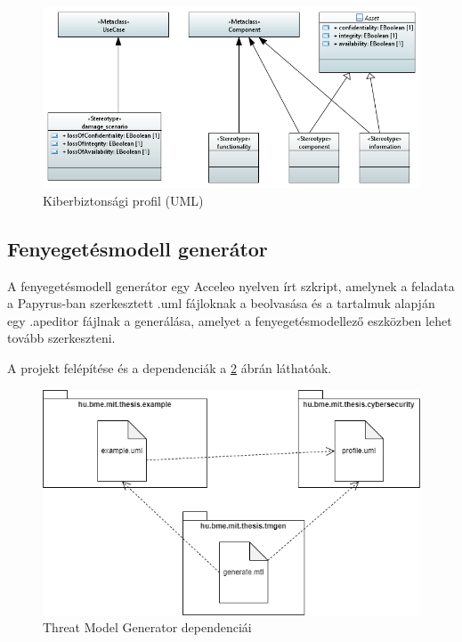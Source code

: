 \begin{figure}[!ht]
	\centering
	\includegraphics[width=130mm, keepaspectratio]{figures/05_Profile_Diagram.PNG}
	\caption{Kiberbiztonsági profil (UML)}
	\label{fig:05_UML_PROFILE}
\end{figure}

\subsection{Fenyegetésmodell generátor}

A fenyegetésmodell generátor egy Acceleo nyelven írt szkript, amelynek a feladata a Papyrus-ban szerkesztett .uml fájloknak a beolvasása és a tartalmuk alapján egy .apeditor fájlnak a generálása, amelyet a fenyegetésmodellező eszközben lehet tovább szerkeszteni.

A projekt felépítése és a dependenciák a \ref{fig:05_tmgen_arch} ábrán láthatóak.

\begin{figure}[!ht]
	\centering
	\includegraphics[width=130mm, keepaspectratio]{figures/05_package_tmgen.png}
	\caption{Threat Model Generator dependenciái}
	\label{fig:05_tmgen_arch}
\end{figure}

